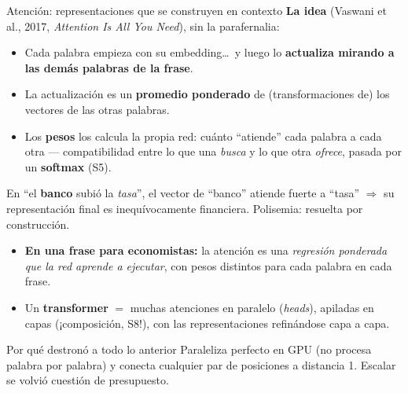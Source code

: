 \documentclass{beamer}
\newcommand{\1}{\mathbb{I}}
\begin{document}
\begin{frame}{Atención: representaciones que se construyen en contexto}
\small
\textbf{La idea} (Vaswani et al., 2017, \emph{Attention Is All You Need}), sin la parafernalia:
\begin{itemize}\itemsep4pt
  \item Cada palabra empieza con su embedding\ldots\ y luego lo \textbf{actualiza mirando a las demás palabras de la frase}.
  \item La actualización es un \textbf{promedio ponderado} de (transformaciones de) los vectores de las otras palabras.
  \item Los \textbf{pesos} los calcula la propia red: cuánto ``atiende'' cada palabra a cada otra --- compatibilidad entre lo que una \emph{busca} y lo que otra \emph{ofrece}, pasada por un \textbf{softmax} (S5).
\end{itemize}
\pause

\vspace{0.1cm}
En ``el \textbf{banco} subió la \emph{tasa}'', el vector de ``banco'' atiende fuerte a ``tasa'' $\Rightarrow$ su representación final es inequívocamente financiera. Polisemia: resuelta por construcción.
\pause

\vspace{0.15cm}
\begin{itemize}\itemsep4pt
  \item \textbf{En una frase para economistas:} la atención es una \emph{regresión ponderada que la red aprende a ejecutar}, con pesos distintos para cada palabra en cada frase.
  \item Un \textbf{transformer} $=$ muchas atenciones en paralelo (\emph{heads}), apiladas en capas (¡composición, S8!), con las representaciones refinándose capa a capa.
\end{itemize}
\pause

\begin{block}{Por qué destronó a todo lo anterior}
Paraleliza perfecto en GPU (no procesa palabra por palabra) y conecta cualquier par de posiciones a distancia 1. Escalar se volvió cuestión de presupuesto.
\end{block}
\end{frame}
\end{document}
